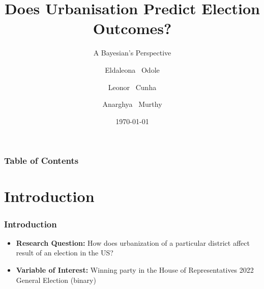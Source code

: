\documentclass{beamer}
\begin{document}
\title[About Beamer]{Does Urbanisation Predict Election Outcomes?}

\subtitle{A Bayesian's Perspective}

\author[Odole, Cunha, Murthy] %
{Eldaleona ~Odole \and Leonor ~Cunha \and Anarghya ~Murthy }


\date{\today} %






\frame{\titlepage}

\begin{frame}
\frametitle{Table of Contents}
\tableofcontents
\end{frame}

\section{Introduction}

\begin{frame}
\frametitle{Introduction}
\begin{itemize}
  \item \textbf{Research Question:}
  How does urbanization of a particular district affect result of an election in the US? 
  \item \textbf{Variable of Interest:}
  Winning party in the  House of Representatives 2022 General Election (binary)
\end{itemize}
\end{frame}
\end{document}
